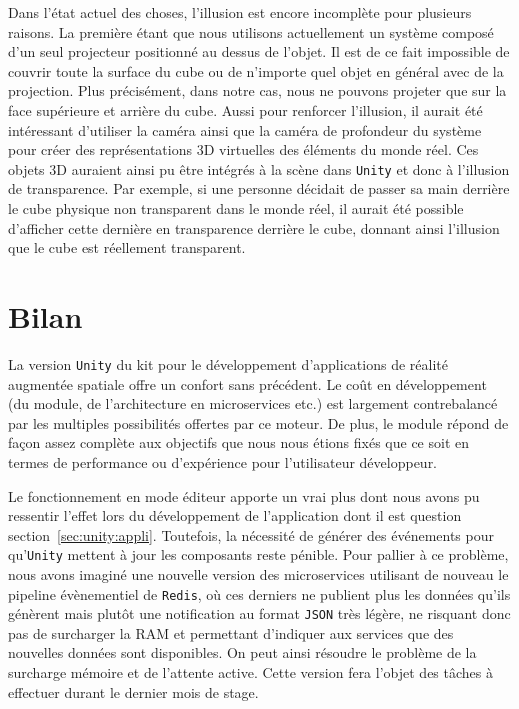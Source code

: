 Dans l'état actuel des choses, l'illusion est encore incomplète pour plusieurs raisons. La première étant que nous utilisons actuellement un système composé d'un seul projecteur positionné au dessus de l'objet. Il est de ce fait impossible de couvrir toute la surface du cube ou de n'importe quel objet en général avec de la projection. Plus précisément, dans notre cas, nous ne pouvons projeter que sur la face supérieure et arrière du cube. Aussi pour renforcer l'illusion, il aurait été intéressant d'utiliser la caméra ainsi que la caméra de profondeur du système pour créer des représentations 3D virtuelles des éléments du monde réel. Ces objets 3D auraient ainsi pu être intégrés à la scène dans \texttt{Unity} et donc à l'illusion de transparence. Par exemple, si une personne décidait de passer sa main derrière le cube physique non transparent dans le monde réel, il aurait été possible d'afficher cette dernière en transparence derrière le cube, donnant ainsi l'illusion que le cube est réellement transparent.

\section{Bilan}
\label{sec:unity:bilan}
La version \texttt{Unity} du kit pour le développement d'applications de réalité augmentée spatiale offre un confort sans précédent. Le coût en développement (du module, de l'architecture en microservices etc.) est largement contrebalancé par les multiples possibilités offertes par ce moteur. De plus, le module répond de façon assez complète aux objectifs que nous nous étions fixés que ce soit en termes de performance ou d'expérience pour l'utilisateur développeur.

Le fonctionnement en mode éditeur apporte un vrai plus dont nous avons pu ressentir l'effet lors du développement de l'application dont il est question section~\ref{sec:unity:appli}. Toutefois, la nécessité de générer des événements pour qu'\texttt{Unity} mettent à jour les composants reste pénible. Pour pallier à ce problème, nous avons imaginé une nouvelle version des microservices utilisant de nouveau le pipeline évènementiel de \texttt{Redis}, où ces derniers ne publient plus les données qu'ils génèrent mais plutôt une notification au format \texttt{JSON}\cite{crockford2006application} très légère, ne risquant donc pas de surcharger la RAM et permettant d'indiquer aux services que des nouvelles données sont disponibles. On peut ainsi résoudre le problème de la surcharge mémoire et de l'attente active. Cette version fera l'objet des tâches à effectuer durant le dernier mois de stage.

